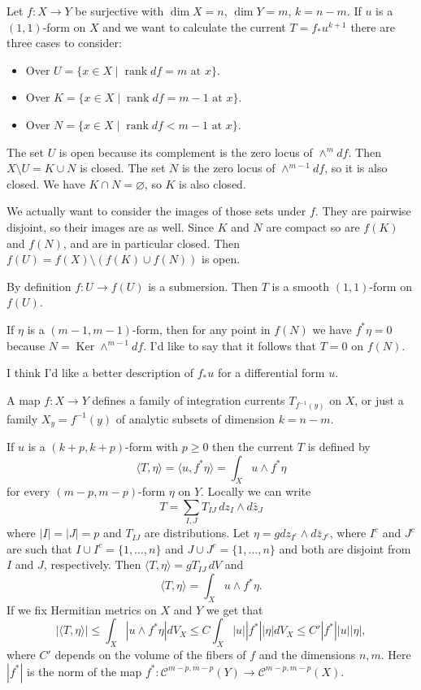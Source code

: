 \documentclass[11pt]{amsart}
\theoremstyle{definition}
\def\rank{\operatorname{rank}}
\DeclareMathOperator{\Ker}{Ker}
\def\<{\langle}
\def\>{\rangle}
\begin{document}
Let $f : X \to Y$ be surjective with $\dim X = n$, $\dim Y = m$, $k = n-m$.
If $u$ is a $(1,1)$-form on $X$ and we want to calculate the current $T = f_*u^{k+1}$ there are three cases to consider:

\begin{itemize}
\item
Over $U = \{ x \in X \mid \text{$\rank df = m$ at $x$}\}$.

\item
Over $K = \{ x \in X \mid \text{$\rank df = m-1$ at $x$}\}$.

\item
Over $N = \{ x \in X \mid \text{$\rank df < m-1$ at $x$}\}$.
\end{itemize}

The set $U$ is open because its complement is the zero locus of $\wedge^{m} df$.
Then $X \setminus U = K \cup N$ is closed.
The set $N$ is the zero locus of $\wedge^{m-1} df$, so it is also closed.
We have $K \cap N = \varnothing$, so $K$ is also closed.

We actually want to consider the images of those sets under $f$.
They are pairwise disjoint, so their images are as well.
Since $K$ and $N$ are compact so are $f(K)$ and $f(N)$, and are in particular closed.
Then $f(U) = f(X) \setminus (f(K) \cup f(N))$ is open.

By definition $f : U \to f(U)$ is a submersion.
Then $T$ is a smooth $(1,1)$-form on $f(U)$.

If $\eta$ is a $(m-1,m-1)$-form, then for any point in $f(N)$ we have $f^*\eta = 0$ because $N = \Ker \wedge^{m-1} df$.
I'd like to say that it follows that $T = 0$ on $f(N)$.

I think I'd like a better description of $f_*u$ for a differential form $u$.

A map $f : X \to Y$ defines a family of integration currents $T_{f^{-1}(y)}$ on $X$, or just a family $X_y = f^{-1}(y)$ of analytic subsets of dimension $k = n-m$.

If $u$ is a $(k+p,k+p)$-form with $p \geq 0$ then the current $T$ is defined by
\[
\< T, \eta \> 
= \< u, f^*\eta \>
= \int_X u \wedge f^*\eta
\]
for every $(m-p,m-p)$-form $\eta$ on $Y$.
Locally we can write
\[
T = \sum_{I,J} T_{IJ} \, d z_I \wedge d\bar z_J
\]
where $|I| = |J| = p$ and $T_{IJ}$ are distributions.
Let $\eta = g dz_{I^c} \wedge d\bar z_{J^c}$, where $I^c$ and $J^c$ are such that $I \cup I^c = \{1, \ldots, n\}$ and $J \cup J^c = \{1, \ldots, n\}$ and both are disjoint from $I$ and $J$, respectively.
Then $\< T, \eta \> = g T_{IJ}\, dV$ and
\[
\<T, \eta\>
= \int_X u \wedge f^*\eta.
\]
If we fix Hermitian metrics on $X$ and $Y$ we get that
\[
|\<T, \eta\>|
\leq \int_X | u \wedge f^*\eta | dV_X
\leq C \int_X |u| |f^*| |\eta| dV_X
\leq C' |f^*| |u| |\eta|,
\]
where $C'$ depends on the volume of the fibers of $f$ and the dimensions $n,m$.
Here $|f^*|$ is the norm of the map $f^* : \mathcal{C}^{m-p,m-p}(Y) \to \mathcal{C}^{m-p,m-p}(X)$.
\end{document}
